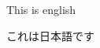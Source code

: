 \documentclass{article}
\newcommand{\textjp}[1]{\begin{CJK}{UTF8}{min}#1\end{CJK}}
\begin{document}
This is english

\textjp{これは日本語です}
\end{document}

